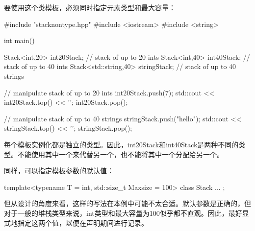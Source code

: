 要使用这个类模板，必须同时指定元素类型和最大容量：

\begin{cpp}
#include "stacknontype.hpp"
#include <iostream>
#include <string>

int main() {
	Stack<int,20> int20Stack; // stack of up to 20 ints
	Stack<int,40> int40Stack; // stack of up to 40 ints
	Stack<std::string,40> stringStack; // stack of up to 40 strings
	
	// manipulate stack of up to 20 ints
	int20Stack.push(7);
	std::cout << int20Stack.top() << '\n';
	int20Stack.pop();
	
	// manipulate stack of up to 40 strings
	stringStack.push("hello");
	std::cout << stringStack.top() << '\n';
	stringStack.pop();
}
\end{cpp}

每个模板实例化都是独立的类型。因此，int20Stack和int40Stack是两种不同的类型。不能使用其中一个来代替另一个，也不能将其中一个分配给另一个。

同样，可以指定模板参数的默认值：

\begin{cpp}
template<typename T = int, std::size_t Maxsize = 100>
class Stack {
	...
};
\end{cpp}

但从设计的角度来看，这样的写法在本例中可能不太合适。默认参数是正确的，但对于一般的堆栈类型来说，int类型和最大容量为100似乎都不直观。因此，最好显式地指定这两个值，以便在声明期间进行记录。





























